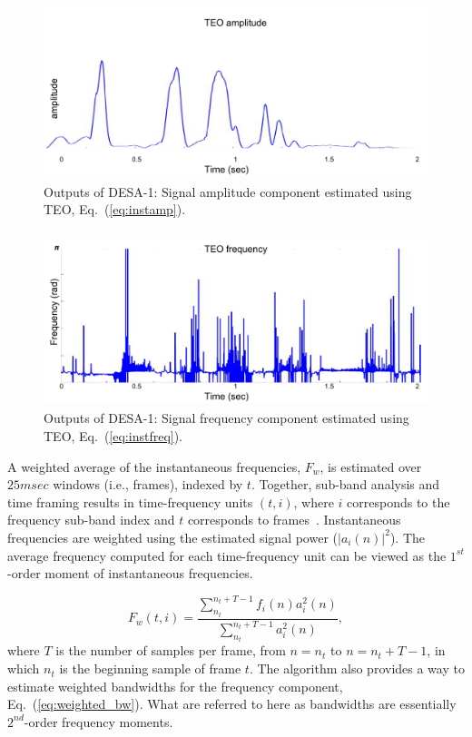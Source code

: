 {\vspace{1.0mm}
\begin{figure}[h!]
	\centering
	\includegraphics[height=2in, width=1\textwidth]{figures/teo_amp}
	\caption{ Outputs of DESA-1: Signal amplitude component estimated using TEO, Eq.~(\ref{eq:instamp}).}
	\label{fig:ch2_inputamplitude}
\end{figure}

\begin{figure}[h!]
	\centering
	\includegraphics[height=2in, width=1\textwidth]{figures/teo_freq}
	\caption{ Outputs of DESA-1: Signal frequency component estimated using TEO,  Eq.~(\ref{eq:instfreq}).}
	\label{fig:ch2_inputfrequency}
\end{figure}

A weighted average of the instantaneous frequencies, $F_w$, is estimated over $25msec$ windows (i.e., frames), indexed by $t$. 
Together, sub-band analysis and time framing results in time-frequency units $(t,i)$, where $i$ corresponds to the frequency sub-band index and $t$ corresponds to frames~\cite{cohenlee90}.
Instantaneous frequencies are weighted using the estimated signal power ($|a_i(n)|^2$). 
The average frequency computed for each time-frequency unit can be viewed as the $1^{st}$-order moment of instantaneous frequencies.  


\begin{equation}
\label{eq:weighted_f}
F_w(t,i) = \frac{\sum_{n_t}^{n_t+T - 1}f_i(n)a_i^2(n)}{\sum_{n_t}^{n_t+T - 1}a_i^2(n)},
\end{equation}
where $T$ is the number of samples per frame, from $n = n_t$ to $n = n_t+T - 1$, in which $n_t$ is the beginning sample of frame $t$. 
The algorithm also provides a way to estimate weighted bandwidths for the frequency component, Eq.~(\ref{eq:weighted_bw}). 
What are referred to here as bandwidths are essentially $2^{nd}$-order frequency moments. 

}
